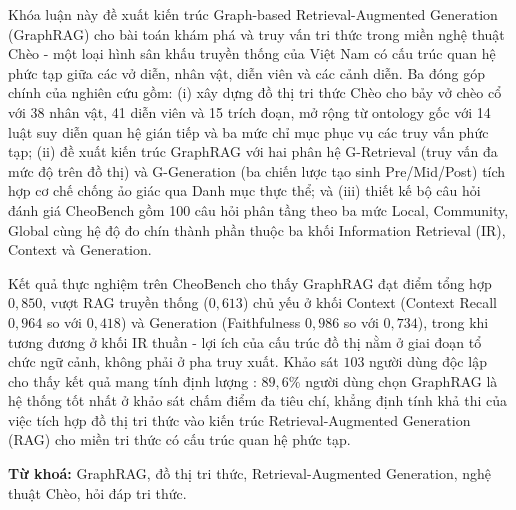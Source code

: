 Khóa luận này đề xuất kiến trúc Graph-based Retrieval-Augmented Generation (GraphRAG) cho bài toán khám phá và truy vấn tri thức trong miền nghệ thuật Chèo - một loại hình sân khấu truyền thống của Việt Nam có cấu trúc quan hệ phức tạp giữa các vở diễn, nhân vật, diễn viên và các cảnh diễn. Ba đóng góp chính của nghiên cứu gồm: (i) xây dựng đồ thị tri thức Chèo cho bảy vở chèo cổ với 38 nhân vật, 41 diễn viên và 15 trích đoạn, mở rộng từ ontology gốc với 14 luật suy diễn quan hệ gián tiếp và ba mức chỉ mục phục vụ các truy vấn phức tạp; (ii) đề xuất kiến trúc GraphRAG với hai phân hệ G-Retrieval (truy vấn đa mức độ trên đồ thị) và G-Generation (ba chiến lược tạo sinh Pre/Mid/Post) tích hợp cơ chế chống ảo giác qua Danh mục thực thể; và (iii) thiết kế bộ câu hỏi đánh giá CheoBench gồm 100 câu hỏi phân tầng theo ba mức Local, Community, Global cùng hệ độ đo chín thành phần thuộc ba khối Information Retrieval (IR), Context và Generation.

Kết quả thực nghiệm trên CheoBench cho thấy GraphRAG đạt điểm tổng hợp $0,850$, vượt RAG truyền thống ($0,613$) chủ yếu ở khối Context (Context Recall $0,964$ so với $0,418$) và Generation (Faithfulness $0,986$ so với $0,734$), trong khi tương đương ở khối IR thuần - lợi ích của cấu trúc đồ thị nằm ở giai đoạn tổ chức ngữ cảnh, không phải ở pha truy xuất. Khảo sát $103$ người dùng độc lập cho thấy kết quả mang tính định lượng : $89,6\%$ người dùng chọn GraphRAG là hệ thống tốt nhất ở khảo sát chấm điểm đa tiêu chí, khẳng định tính khả thi của việc tích hợp đồ thị tri thức vào kiến trúc Retrieval-Augmented Generation (RAG) cho miền tri thức có cấu trúc quan hệ phức tạp.

\vspace{0.5em}
\noindent\textbf{Từ khoá:} GraphRAG, đồ thị tri thức, Retrieval-Augmented Generation, nghệ thuật Chèo, hỏi đáp tri thức.
